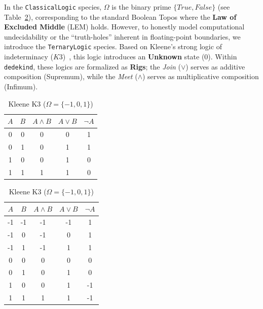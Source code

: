 \documentclass[11pt, a4paper]{report}
\begin{document}
In the \texttt{ClassicalLogic} species, $\Omega$ is the binary prime $\{True, False\}$ (see Table~\ref{tab:logic_comparison}), corresponding to the standard Boolean Topos where the \textbf{Law of Excluded Middle} (LEM) holds. However, to honestly model computational undecidability or the ``truth-holes'' inherent in floating-point boundaries, we introduce the \texttt{TernaryLogic} species. Based on Kleene's strong logic of indeterminacy ($K3$)~\cite{mclarty1992toposes}, this logic introduces an \textbf{Unknown} state ($0$). Within \texttt{dedekind}, these logics are formalized as \textbf{Rigs}; the \textit{Join} ($\lor$) serves as additive composition (Supremum), while the \textit{Meet} ($\land$) serves as multiplicative composition (Infimum).

\begin{table}[htbp]
\centering
\caption{Truth Tables for Classical ($\Omega_{\mathbb{B}}$) and Kleene ($\Omega_{K3}$) Toposes.}
\label{tab:logic_comparison}
\begin{minipage}{.45\linewidth}
\centering
\caption*{Classical ($\Omega = \{0, 1\}$)}
\begin{tabular}{cc|ccc}
\hline
$A$ & $B$ & $A \land B$ & $A \lor B$ & $\neg A$ \\ \hline
0 & 0 & 0 & 0 & 1 \\
0 & 1 & 0 & 1 & 1 \\
1 & 0 & 0 & 1 & 0 \\
1 & 1 & 1 & 1 & 0 \\ \hline
\end{tabular}
\end{minipage}
\begin{minipage}{.5\linewidth}
\centering
\caption*{Kleene K3 ($\Omega = \{-1, 0, 1\}$)}
\begin{tabular}{cc|ccc}
\hline
$A$ & $B$ & $A \land B$ & $A \lor B$ & $\neg A$ \\ \hline
-1 & -1 & -1 & -1 & 1 \\
-1 & 0  & -1 & 0  & 1 \\
-1 & 1  & -1 & 1  & 1 \\
0  & 0  & 0  & 0  & 0 \\
0  & 1  & 0  & 1  & 0 \\
1  & 0  & 0  & 1  & -1 \\ %
1  & 1  & 1  & 1  & -1 \\ \hline
\end{tabular}
\end{minipage}
\end{table}
\end{document}
